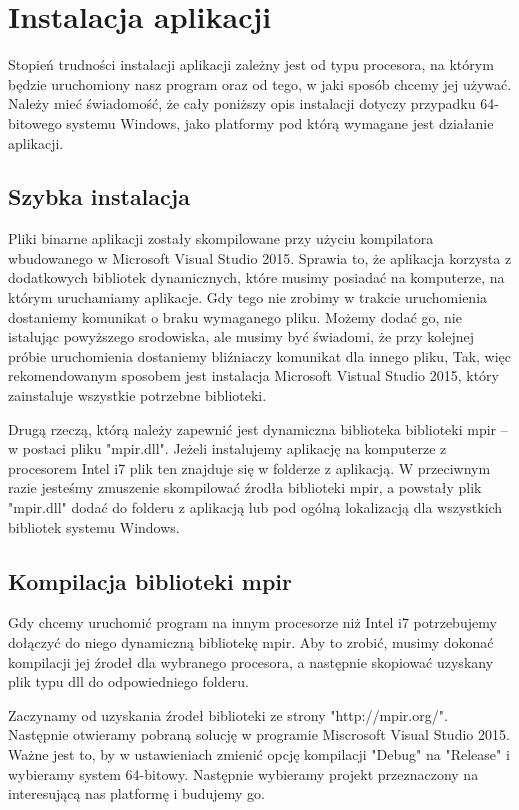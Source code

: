 \documentclass[oneside,a4paper]{book}
\begin{document}
	\section{Instalacja aplikacji}
	
	Stopień trudności instalacji aplikacji zależny jest od typu procesora, na którym będzie uruchomiony nasz program oraz od tego, w jaki sposób chcemy jej używać. Należy mieć świadomość, że cały poniższy opis instalacji dotyczy przypadku 64-bitowego systemu Windows, jako platformy pod którą wymagane jest działanie aplikacji.
	
	\subsection{Szybka instalacja}
	
	Pliki binarne aplikacji zostały skompilowane przy użyciu kompilatora wbudowanego w Microsoft Visual Studio 2015. Sprawia to, że aplikacja korzysta z dodatkowych bibliotek dynamicznych, które musimy posiadać na komputerze, na którym uruchamiamy aplikacje. Gdy tego nie zrobimy w trakcie uruchomienia dostaniemy komunikat o braku wymaganego pliku.
	Możemy dodać go, nie istalując powyższego srodowiska, ale musimy być świadomi, że przy kolejnej próbie uruchomienia dostaniemy bliźniaczy komunikat dla innego pliku, Tak, więc rekomendowanym sposobem jest instalacja Microsoft Vistual Studio 2015, który zainstaluje wszystkie potrzebne biblioteki.
	
	Drugą rzeczą, którą należy zapewnić jest dynamiczna biblioteka biblioteki mpir -- w postaci pliku "mpir.dll". Jeżeli instalujemy aplikację na komputerze z procesorem Intel i7 plik ten znajduje się w folderze z aplikacją. W przeciwnym razie jesteśmy zmuszenie skompilować źrodła biblioteki mpir, a powstały plik "mpir.dll" dodać do folderu z aplikacją lub pod ogólną lokalizacją dla wszystkich bibliotek systemu Windows.
	
	\subsection{Kompilacja biblioteki mpir}
	
	Gdy chcemy uruchomić program na innym procesorze niż Intel i7 potrzebujemy dołączyć do niego dynamiczną bibliotekę mpir. Aby to zrobić, musimy dokonać kompilacji jej źrodeł dla wybranego procesora, a następnie skopiować uzyskany plik typu dll do odpowiedniego folderu.
	
	Zaczynamy od uzyskania źrodeł biblioteki ze strony "http://mpir.org/". Następnie otwieramy pobraną solucję w programie Miscrosoft Visual Studio 2015. Ważne jest to, by w ustawieniach zmienić opcję kompilacji "Debug" na "Release" i wybieramy system 64-bitowy. Następnie wybieramy projekt przeznaczony na interesującą nas platformę i budujemy go.
	
\end{document}
